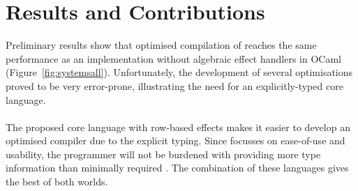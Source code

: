 \documentclass[sigplan,10pt]{acmart}\settopmatter{printfolios=true}
\begin{document}
\section{Results and Contributions}
Preliminary results show that optimised compilation of \eff reaches the same performance as an implementation without algebraic effect handlers in OCaml (Figure~\ref{fig:systemsall}). Unfortunately, the development of several optimisations proved to be very error-prone, illustrating the need for an explicitly-typed core language. \\
\\
The proposed core language with row-based effects makes it easier to develop an optimised compiler due to the explicit typing. Since \eff focusses on ease-of-use and usability, the programmer will not be burdened with providing more type information than minimally required \cite{inferring, handling}. The combination of these languages gives the best of both worlds.
\\
\end{document}
